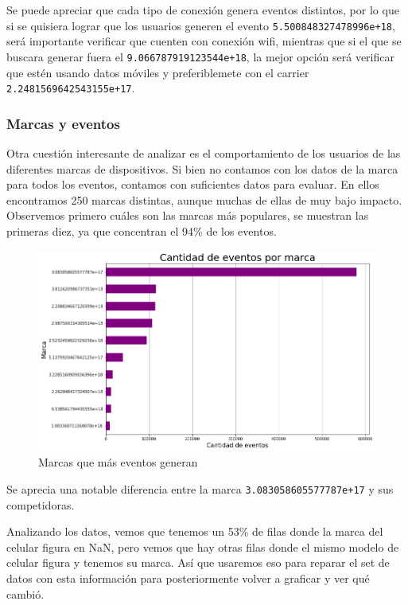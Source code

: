 \documentclass[a4paper, 12pt]{article}
\begin{document}
			Se puede apreciar que cada tipo de conexión genera eventos distintos, por lo que si se quisiera lograr que los usuarios generen el evento \texttt{5.500848327478996e+18}, será importante verificar que cuenten con conexión wifi, mientras que si el que se buscara generar fuera el \texttt{9.066787919123544e+18}, la mejor opción será verificar que estén usando datos móviles y preferiblemete con el carrier \texttt{2.2481569642543155e+17}.

	\subsubsection{Marcas y eventos}
		Otra cuestión interesante de analizar es el comportamiento de los usuarios de las diferentes marcas de dispositivos.
		Si bien no contamos con los datos de la marca para todos los eventos, contamos con suficientes datos para evaluar.
		En ellos encontramos 250 marcas distintas, aunque muchas de ellas de muy bajo impacto.
		Observemos primero cuáles son las marcas más populares, se muestran las primeras diez, ya que concentran el 94\% de los eventos.

		\FloatBarrier
		\begin{figure}[h]
			\centering
			\includegraphics[width=\textwidth]{images/events/marcas.png}
			\caption{Marcas que más eventos generan}
		\end{figure}
		\FloatBarrier

		Se aprecia una notable diferencia entre la marca \texttt{3.083058605577787e+17} y sus competidoras.

		Analizando los datos, vemos que tenemos un 53\% de filas donde la marca del celular figura en NaN, pero vemos que hay
		otras filas donde el mismo modelo de celular figura y tenemos su marca. Así que usaremos eso para reparar
		el set de datos con esta información para posteriormente volver a graficar y ver qué cambió.
\end{document}
